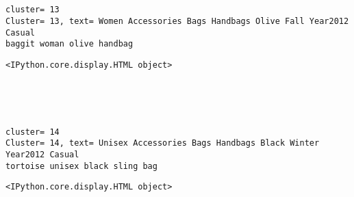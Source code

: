 \documentclass[11pt]{article}
\begin{document}
    
    \begin{center}
    \end{center}
    { \hspace*{\fill} \\}
    
    \begin{center}
    \end{center}
    { \hspace*{\fill} \\}
    
    \begin{Verbatim}[commandchars=\\\{\}]
cluster= 13
Cluster= 13, text= Women Accessories Bags Handbags Olive Fall Year2012 Casual
baggit woman olive handbag
    \end{Verbatim}

    
    \begin{Verbatim}[commandchars=\\\{\}]
<IPython.core.display.HTML object>
    \end{Verbatim}

    
    \begin{center}
    \end{center}
    { \hspace*{\fill} \\}
    
    \begin{center}
    \end{center}
    { \hspace*{\fill} \\}
    
    \begin{Verbatim}[commandchars=\\\{\}]
cluster= 14
Cluster= 14, text= Unisex Accessories Bags Handbags Black Winter Year2012 Casual
tortoise unisex black sling bag
    \end{Verbatim}

    
    \begin{Verbatim}[commandchars=\\\{\}]
<IPython.core.display.HTML object>
    \end{Verbatim}
\end{document}

